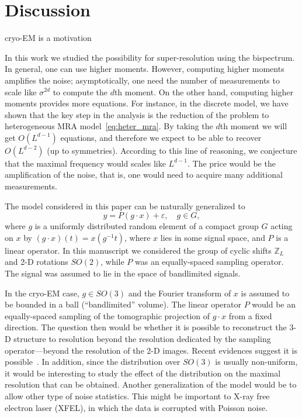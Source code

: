 \documentclass[english,12pt]{article}
\newcommand{\TODO}[1]{{\color{red}{[#1]}}}
\numberwithin{equation}{section}
\numberwithin{thm}{section} %
\begin{document}
\section{Discussion} \label{sec:future_work}


cryo-EM is a motivation~\cite{chen2018single}


In this work we studied the possibility for super-resolution using the bispectrum. In general, one can use higher moments. However, computing higher moments amplifies the noise; asymptotically, one need the number of measurements to scale like $\sigma^{2d}$ to compute the $d$th moment. On the other hand, computing higher moments provides more equations. For instance, in the discrete model, we have shown that the key step in the analysis is the reduction of the problem to heterogeneous MRA model~\eqref{eq:heter_mra}.  By taking the $d$th moment we will get  $O(L^{d-1})$ equations, and therefore we expect to be able to recover $O(L^{d-2})$ (up to symmetries). According to this line of reasoning, we conjecture that the maximal frequency would scales like $L^{d-1}$. The price would be the amplification of the noise, that is, one would need to acquire many additional measurements.  

The model considered in this paper can be naturally generalized to 
\begin{equation} \label{eq:general_model}
y = P (g\cdot x) + \varepsilon,\quad g\in G,
\end{equation}
where $g$ is a uniformly distributed random element of a compact group $G$ acting on $x$ by $(g\cdot x)(t) = x(g^{-1}t)$, where $x$ lies in some signal space, and $P$ is a linear operator.  In this manuscript we considered the group of cyclic shifts $\mathbb{Z}_L$ and 2-D rotations $SO(2)$, while $P$ was an equally-spaced sampling operator. The signal was assumed to lie in the space of bandlimited signals.  \TODO{Refs to papers on bispectrum for general groups}

In the cryo-EM case, $g\in SO(3)$ and the Fourier transform of $x$ is assumed to be bounded in a ball (``bandlimited'' volume). The linear operator $P$ would be an equally-spaced sampling of the tomographic projection of $g\cdot x$ from a fixed direction. The question then would be whether it is possible to reconstruct the 3-D structure to resolution beyond the resolution dedicated by the sampling operator---beyond the resolution of the 2-D images. Recent evidences suggest it is possible~\cite{chen2018single}. In addition, since the distribution over $SO(3)$ is usually non-uniform, it would be interesting to study the effect of the distribution on the maximal resolution that can be obtained. Another generalization of the model would be to allow other type of noise statistics. This might be important to X-ray free electron laser (XFEL), in which the data is corrupted with Poisson noise.
 
\end{document}
